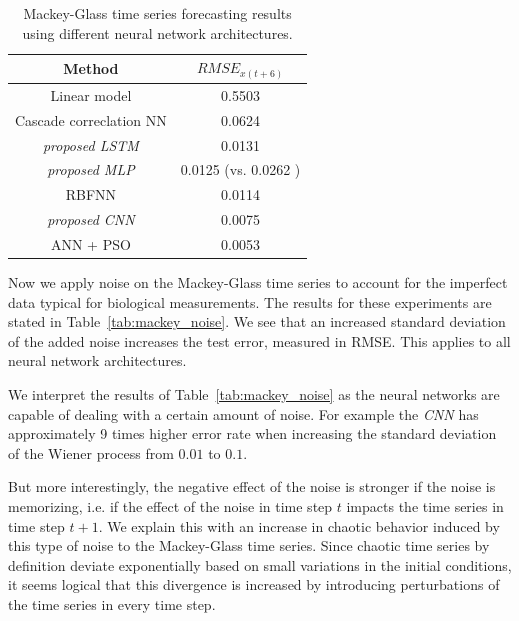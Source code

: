 \documentclass{article}
\begin{document}
\begin{table}
    \centering
    \begin{tabular}{c|c}
        Method                         & $RMSE_{x(t+6)}$                          \\
        \hline
        Linear model                   & 0.5503                                   \\
        Cascade correclation NN        & 0.0624                                   \\
        \textit{proposed LSTM}         & 0.0131                                   \\
        \textit{proposed MLP}          & 0.0125 (vs. 0.0262 \cite{lopez2016}) \\
        RBFNN                          & 0.0114                                   \\
        \textit{proposed CNN}          & 0.0075                                   \\
        ANN + PSO \cite{lopez2016} & 0.0053                                   \\
    \end{tabular}
    \caption{Mackey-Glass time series forecasting results using different neural
        network architectures.}
    \label{tab:mackey_results}
\end{table}

Now we apply noise on the Mackey-Glass time series to account for the imperfect
data typical for biological measurements. The results for these
experiments are stated in Table~\ref{tab:mackey_noise}. We see that an increased
standard deviation of the added noise increases the test error, measured in
RMSE. This applies to all neural network architectures.

We interpret the results of Table~\ref{tab:mackey_noise}
as the neural networks are capable of dealing with a certain
amount of noise. For example the \emph{CNN} has
approximately 9 times higher error rate when increasing the standard 
deviation of the Wiener process from $0.01$ to $0.1$.

But more interestingly,
the negative effect of the noise is stronger if the noise is memorizing, i.e. if
the effect of the noise in time step $t$ impacts the time series in time step
$t + 1$. We explain this with an increase in chaotic behavior induced by this
type of noise to the Mackey-Glass time series. Since chaotic time series by
definition deviate exponentially based on small variations in the initial
conditions, it seems logical that this divergence is increased by introducing
perturbations of the time series in every time step.
\end{document}
